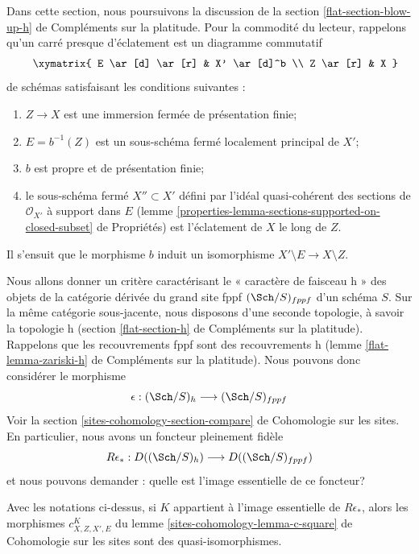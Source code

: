 \noindent
Dans cette section, nous poursuivons la discussion de la
section \ref{flat-section-blow-up-h} de Compléments sur la platitude.
Pour la commodité du lecteur, rappelons qu'un
carré presque d'éclatement est un diagramme commutatif
\begin{equation}
\label{equation-almost-blow-up-square}
\vcenter{
\xymatrix{
E \ar[d] \ar[r] & X' \ar[d]^b \\
Z \ar[r] & X
}
}
\end{equation}
de schémas satisfaisant les conditions suivantes :
\begin{enumerate}
\item $Z \to X$ est une immersion fermée de présentation finie;
\item $E = b^{-1}(Z)$ est un sous-schéma fermé localement principal de $X'$;
\item $b$ est propre et de présentation finie;
\item le sous-schéma fermé $X'' \subset X'$ défini par l'idéal quasi-cohérent
des sections de $\mathcal{O}_{X'}$ à support dans $E$
(lemme \ref{properties-lemma-sections-supported-on-closed-subset} de Propriétés)
est l'éclatement de $X$ le long de $Z$.
\end{enumerate}
Il s'ensuit que le morphisme $b$ induit un isomorphisme
$X' \setminus E \to X \setminus Z$.

\medskip\noindent
Nous allons donner un critère caractérisant le « caractère de faisceau h » des
objets de la catégorie dérivée du grand site fppf
$(\Sch/S)_{fppf}$ d'un schéma $S$. Sur la même catégorie sous-jacente,
nous disposons d'une seconde topologie, à savoir la topologie h
(section \ref{flat-section-h} de Compléments sur la platitude).
Rappelons que les recouvrements fppf sont des recouvrements h
(lemme \ref{flat-lemma-zariski-h} de Compléments sur la platitude). Nous pouvons donc
considérer le morphisme
$$
\epsilon : (\Sch/S)_h \longrightarrow (\Sch/S)_{fppf}
$$
Voir la section \ref{sites-cohomology-section-compare} de Cohomologie sur les sites.
En particulier, nous avons un foncteur pleinement fidèle
$$
R\epsilon_* : D((\Sch/S)_h) \longrightarrow D((\Sch/S)_{fppf})
$$
et nous pouvons demander : quelle est l'image essentielle de ce foncteur?

\begin{lemma}
\label{lemma-blow-up-square-h}
Avec les notations ci-dessus, si $K$ appartient à l'image essentielle
de $R\epsilon_*$, alors les morphismes $c^K_{X, Z, X', E}$ du
lemme \ref{sites-cohomology-lemma-c-square} de Cohomologie sur les sites
sont des quasi-isomorphismes.
\end{lemma}

